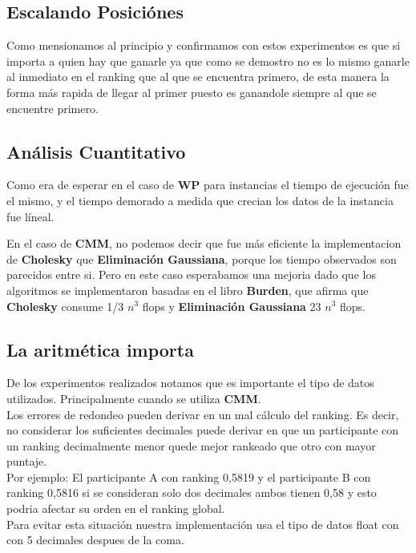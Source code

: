 \subsection{Escalando Posici\'ones}
Como mensionamos al principio y confirmamos con estos experimentos es que si importa a quien hay que ganarle ya que como se demostro no es lo mismo ganarle al inmediato en el 
ranking que al que se encuentra primero,
de esta manera la forma m\'as rapida de llegar al primer puesto es ganandole siempre al que se encuentre primero.

\subsection{Análisis Cuantitativo}

Como era de esperar en el caso de \textbf{WP} para instancias el tiempo de ejecución fue el mismo, y el tiempo demorado a medida que crecian los datos de la instancia fue l\'ineal.

En el caso de \textbf{CMM}, no podemos decir que fue m\'as eficiente la implementacion de \textbf{Cholesky} que \textbf{Eliminación Gaussiana}, porque los tiempo observados son parecidos entre si. 
Pero en este caso esperabamos una mejoria dado que los algoritmos se implementaron basadas en el libro \textbf{Burden}, que afirma que \textbf{Cholesky} consume 1/3 $n^3$ flops y 
\textbf{Eliminación Gaussiana} 2\/3 $n^3$ flops.


\subsection{La aritmética importa}

De los experimentos realizados notamos que es importante el tipo de datos utilizados. Principalmente cuando se utiliza \textbf{CMM}.
\\

Los errores de redondeo pueden derivar en un mal cálculo del ranking. Es decir, no considerar los suficientes decimales puede derivar en que un participante con un ranking
decimalmente menor quede mejor rankeado que otro con mayor puntaje.\\

Por ejemplo: El participante A con ranking 0,5819 y el participante B con ranking 0,5816 si se consideran solo dos decimales ambos tienen 0,58 y esto podria afectar su orden 
en el ranking global. \\

Para evitar esta situaci\'on nuestra implementación usa el tipo de datos float con con 5 decimales despues de la coma.\\


